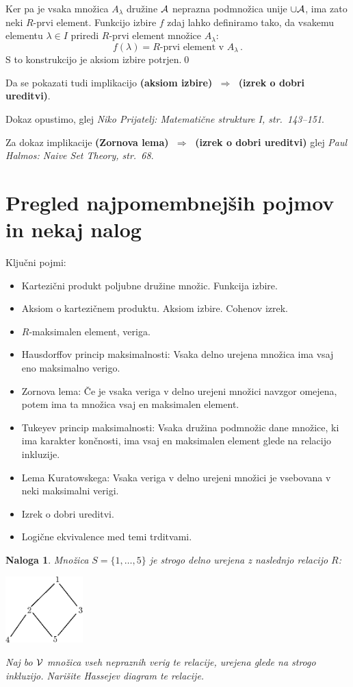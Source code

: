 \documentclass[11pt,paper=b5,footinclude,headinclude]{scrbook} %
\def\sledi {{~\Rightarrow~}}
\newtheorem*{problem}{Naloga}
\begin{document}
Ker pa je vsaka množica $A_\lambda$ družine ${\cal A}$ neprazna podmnožica
unije $\cup{\cal A}$, ima zato neki $R$-prvi element.
Funkcijo izbire $f$ zdaj lahko definiramo tako, da vsakemu elementu $\lambda\in I$ priredi
$R$-prvi element množice $A_\lambda$:
$$f(\lambda) = R\textrm{-prvi element v }A_\lambda\,.$$
S to konstrukcijo je aksiom izbire potrjen.\qed

Da se pokazati tudi implikacijo \textbf{(aksiom izbire) $\sledi$ (izrek o dobri ureditvi)}.

Dokaz opustimo, glej \emph{ Niko Prijatelj: Matemati\v cne strukture I, str.~143--151}.

Za dokaz implikacije \textbf{(Zornova lema) $\sledi$ (izrek o dobri ureditvi)}
glej \emph{ Paul Halmos: Naive Set Theory, str.~68}.

\section{Pregled najpomembnejših pojmov in nekaj nalog}

Ključni pojmi:
\begin{itemize}
\item Kartezični produkt poljubne družine množic.
Funkcija izbire.
\item Aksiom o kartezičnem produktu. Aksiom izbire. Cohenov izrek.
\item $R$-maksimalen element, veriga.
\item Hausdorffov princip maksimalnosti: Vsaka delno urejena množica ima vsaj eno maksimalno verigo.
\item Zornova lema: Če je vsaka veriga v delno urejeni množici navzgor omejena, potem ima ta množica vsaj en maksimalen element.
\item Tukeyev princip maksimalnosti: Vsaka družina podmnožic dane množice, ki ima karakter končnosti, ima vsaj en maksimalen element glede na relacijo inkluzije.
\item Lema Kuratowskega: Vsaka veriga v delno urejeni množici je vsebovana v neki maksimalni verigi.
\item Izrek o dobri ureditvi.
\item Logične ekvivalence med temi trditvami.
\end{itemize}

\begin{problem}
Množica $S=\{1,\ldots,5\}$ je strogo delno urejena z naslednjo relacijo $R$:
\begin{center}
\includegraphics[width=30mm]{hasse5.eps}
\end{center}
Naj bo ${\cal V}$ množica vseh nepraznih verig te relacije, urejena glede na strogo inkluzijo.
Narišite Hassejev diagram te relacije.
\end{problem}
\end{document}
